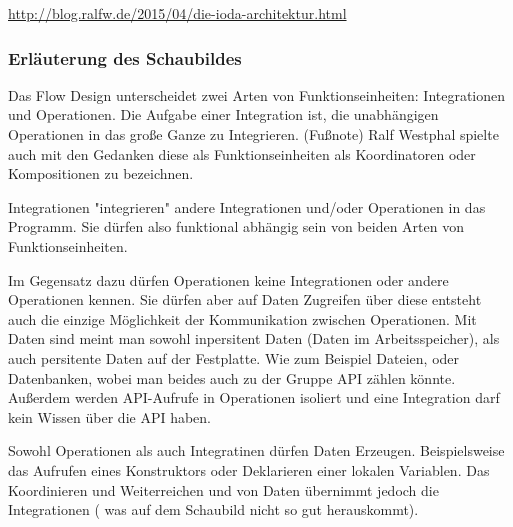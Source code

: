\documentclass[11pt]{article}
\begin{document}
\url{http://blog.ralfw.de/2015/04/die-ioda-architektur.html}

\subsubsection{Erläuterung des Schaubildes}
\label{sec:orgheadline24}
Das Flow Design unterscheidet zwei Arten von Funktionseinheiten: Integrationen und Operationen.
Die Aufgabe einer Integration ist, die unabhängigen Operationen in das große Ganze zu
Integrieren. 
(Fußnote) Ralf Westphal spielte auch mit den Gedanken diese als Funktionseinheiten als Koordinatoren oder
Kompositionen zu bezeichnen.

Integrationen "integrieren" andere Integrationen und/oder Operationen in das Programm. Sie dürfen also funktional abhängig sein
von beiden Arten von Funktionseinheiten.

Im Gegensatz dazu dürfen Operationen keine Integrationen oder andere Operationen kennen. 
Sie dürfen aber auf Daten Zugreifen über diese entsteht auch die einzige Möglichkeit der Kommunikation zwischen Operationen.
Mit Daten sind meint man sowohl inpersitent Daten (Daten im Arbeitsspeicher), als auch persitente Daten auf der Festplatte.
Wie zum Beispiel Dateien, oder Datenbanken, wobei man beides auch zu der Gruppe API zählen könnte. 
Außerdem werden API-Aufrufe in Operationen isoliert und eine Integration darf kein Wissen über die API haben.

Sowohl Operationen als auch Integratinen dürfen Daten Erzeugen.
Beispielsweise das Aufrufen eines Konstruktors oder Deklarieren einer lokalen Variablen.
Das Koordinieren und Weiterreichen und von Daten übernimmt jedoch die Integrationen ( was auf dem Schaubild nicht so
gut herauskommt).
\end{document}
